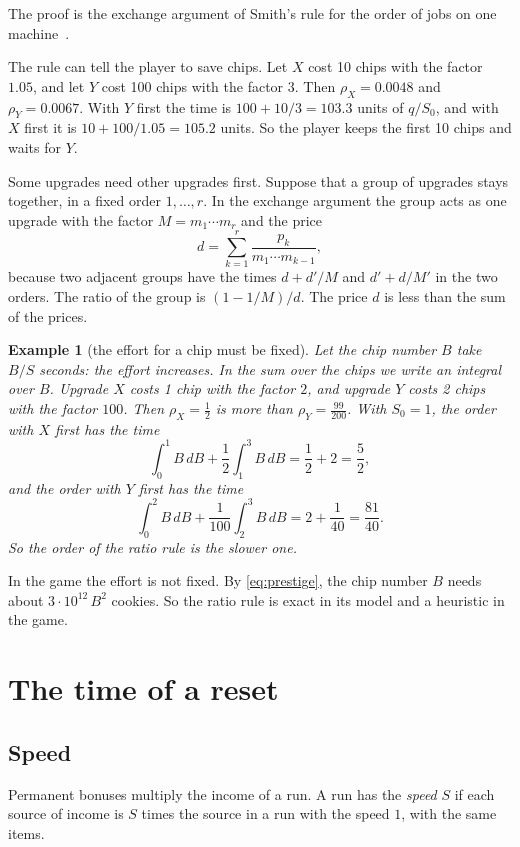 \documentclass[11pt]{article}
\theoremstyle{boxed}
\newtheorem{example}[theorem]{Example}
\begin{document}
The proof is the exchange argument of Smith's rule for the order of jobs on one
machine~\cite{Smith}.

The rule can tell the player to save chips. Let $X$ cost 10 chips with the factor $1.05$, and
let $Y$ cost 100 chips with the factor $3$. Then $\rho_X=0.0048$ and $\rho_Y=0.0067$. With $Y$
first the time is $100+10/3=103.3$ units of $q/S_0$, and with $X$ first it is
$10+100/1.05=105.2$ units. So the player keeps the first 10 chips and waits for $Y$.

Some upgrades need other upgrades first. Suppose that a group of upgrades stays together, in a
fixed order $1,\dots,r$. In the exchange argument the group acts as one upgrade with the factor
$M=m_1\cdots m_r$ and the price
\[
  d=\sum_{k=1}^{r}\frac{p_k}{m_1\cdots m_{k-1}},
\]
because two adjacent groups have the times $d+d'/M$ and $d'+d/M'$ in the two orders. The ratio
of the group is $(1-1/M)/d$. The price $d$ is less than the sum of the prices.

\begin{example}[the effort for a chip must be fixed]\label{ex:effort}
Let the chip number $B$ take $B/S$ seconds: the effort increases. In the sum over the chips we
write an integral over $B$. Upgrade $X$ costs 1 chip with the factor $2$, and upgrade $Y$ costs
2 chips with the factor $100$. Then $\rho_X=\frac12$ is more than $\rho_Y=\frac{99}{200}$. With
$S_0=1$, the order with $X$ first has the time
\[
  \int_0^{1}B\,dB+\frac12\int_1^{3}B\,dB=\frac12+2=\frac52,
\]
and the order with $Y$ first has the time
\[
  \int_0^{2}B\,dB+\frac1{100}\int_2^{3}B\,dB=2+\frac1{40}=\frac{81}{40}.
\]
So the order of the ratio rule is the slower one.
\end{example}

In the game the effort is not fixed. By \eqref{eq:prestige}, the chip number $B$ needs about
$3\cdot10^{12}\,B^{2}$ cookies. So the ratio rule is exact in its model and a heuristic in the
game.

\section{The time of a reset}\label{sec:reset}

\subsection{Speed}

Permanent bonuses multiply the income of a run. A run has the \emph{speed} $S$ if each source of
income is $S$ times the source in a run with the speed $1$, with the same items.
\end{document}
